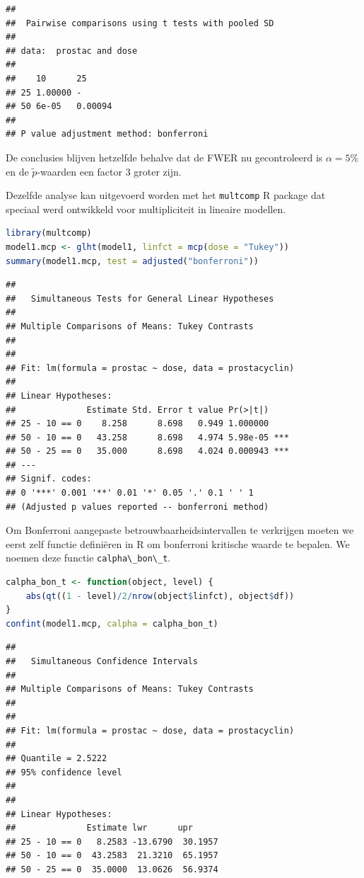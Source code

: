 \documentclass[
  12pt,dutch,coursenotes]{book}
\newcommand{\passthrough}[1]{#1}
\begin{document}
\begin{lstlisting}
## 
##  Pairwise comparisons using t tests with pooled SD 
## 
## data:  prostac and dose 
## 
##    10      25     
## 25 1.00000 -      
## 50 6e-05   0.00094
## 
## P value adjustment method: bonferroni
\end{lstlisting}

De conclusies blijven hetzelfde behalve dat de FWER nu gecontroleerd is \(\alpha=5\%\) en de \(\tilde{p}\)-waarden een factor 3 groter zijn.

Dezelfde analyse kan uitgevoerd worden met het \passthrough{\lstinline!multcomp!} R package dat speciaal werd ontwikkeld voor multipliciteit in lineaire modellen.

\begin{lstlisting}[language=R]
library(multcomp)
model1.mcp <- glht(model1, linfct = mcp(dose = "Tukey"))
summary(model1.mcp, test = adjusted("bonferroni"))
\end{lstlisting}

\begin{lstlisting}
## 
##   Simultaneous Tests for General Linear Hypotheses
## 
## Multiple Comparisons of Means: Tukey Contrasts
## 
## 
## Fit: lm(formula = prostac ~ dose, data = prostacyclin)
## 
## Linear Hypotheses:
##              Estimate Std. Error t value Pr(>|t|)    
## 25 - 10 == 0    8.258      8.698   0.949 1.000000    
## 50 - 10 == 0   43.258      8.698   4.974 5.98e-05 ***
## 50 - 25 == 0   35.000      8.698   4.024 0.000943 ***
## ---
## Signif. codes:  
## 0 '***' 0.001 '**' 0.01 '*' 0.05 '.' 0.1 ' ' 1
## (Adjusted p values reported -- bonferroni method)
\end{lstlisting}

Om Bonferroni aangepaste betrouwbaarheidsintervallen te verkrijgen moeten we eerst zelf functie definiëren in R om bonferroni kritische waarde te bepalen. We noemen deze functie \passthrough{\lstinline!calpha\_bon\_t!}.

\begin{lstlisting}[language=R]
calpha_bon_t <- function(object, level) {
    abs(qt((1 - level)/2/nrow(object$linfct), object$df))
}
confint(model1.mcp, calpha = calpha_bon_t)
\end{lstlisting}

\begin{lstlisting}
## 
##   Simultaneous Confidence Intervals
## 
## Multiple Comparisons of Means: Tukey Contrasts
## 
## 
## Fit: lm(formula = prostac ~ dose, data = prostacyclin)
## 
## Quantile = 2.5222
## 95% confidence level
##  
## 
## Linear Hypotheses:
##              Estimate lwr      upr     
## 25 - 10 == 0   8.2583 -13.6790  30.1957
## 50 - 10 == 0  43.2583  21.3210  65.1957
## 50 - 25 == 0  35.0000  13.0626  56.9374
\end{lstlisting}
\end{document}
